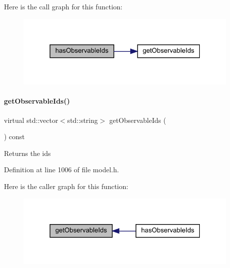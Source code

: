 Here is the call graph for this function\+:
\nopagebreak
\begin{figure}[H]
\begin{center}
\leavevmode
\includegraphics[width=307pt]{classamici_1_1_model_adb0d2d3b3aa9cd648efa3cf408d9abab_cgraph}
\end{center}
\end{figure}
\mbox{\label{classamici_1_1_model_a13ff6d42168b4c62dedd27e274bf3192}} 
\paragraph{\texorpdfstring{get\+Observable\+Ids()}{getObservableIds()}}
{\footnotesize\ttfamily virtual std\+::vector$<$std\+::string$>$ get\+Observable\+Ids (\begin{DoxyParamCaption}{ }\end{DoxyParamCaption}) const\hspace{0.3cm}{\ttfamily [virtual]}}

\begin{DoxyReturn}{Returns}
the ids 
\end{DoxyReturn}


Definition at line 1006 of file model.\+h.

Here is the caller graph for this function\+:
\nopagebreak
\begin{figure}[H]
\begin{center}
\leavevmode
\includegraphics[width=307pt]{classamici_1_1_model_a13ff6d42168b4c62dedd27e274bf3192_icgraph}
\end{center}
\end{figure}
\mbox{\label{classamici_1_1_model_ab8e08cf804357e3ac070c11ac9b8ec35}} 
